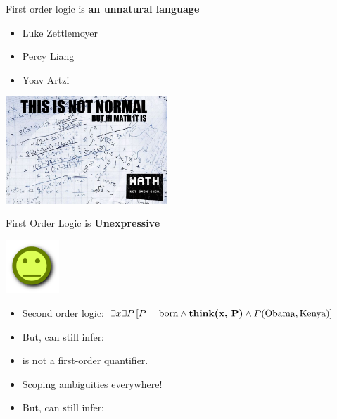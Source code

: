 \begin{frame}{First order logic is \textbf{an unnatural language}}

\begin{itemize}
\item[\checkmark] Luke Zettlemoyer
\item[\checkmark] Percy Liang
\item[\checkmark] Yoav Artzi
\end{itemize}
\vspace{1ex}

\begin{center}
  \includegraphics[height=4cm]{../img/math.jpg}
\end{center}
\end{frame}


\begin{frame}{First Order Logic is \textbf{Unexpressive}}
\begin{center}
  \includegraphics[height=2cm]{../img/pokerface.png}
\end{center}

\begin{itemize}
\item Second order logic: 
      $\exists x \exists P \left[ P = \textrm{born} \land \textbf{\textrm{think}(x, P)} \land P(\textrm{Obama}, \textrm{Kenya}) \right]$
\pause
\item But, can still infer: 
\end{itemize}
\vspace{1ex}
\pause


\begin{itemize}
\item {} is not a first-order quantifier.
\item Scoping ambiguities everywhere!
\pause
\item But, can still infer: 
\end{itemize}

\end{frame}


